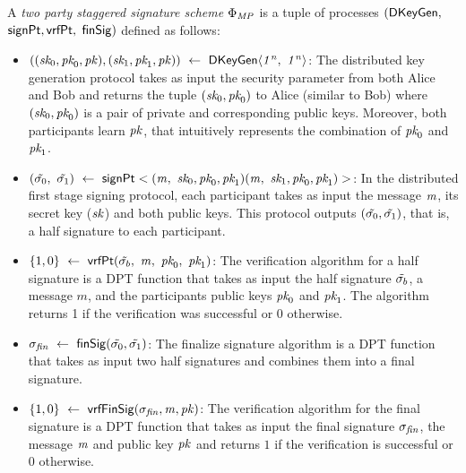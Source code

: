 \begin{definition}
\label{def:two-party-scheme}	
A \emph{two party staggered signature scheme $\Phi_{\mathit{MP}}$} is a tuple of processes $(\mathsf{DKeyGen},$  $\mathsf{signPt}, \mathsf{vrfPt},$ $\mathsf{finSig})$ defined as follows: 
    
    \begin{itemize}
    	\item $((\textit{sk}_0, \textit{pk}_0, \mathit{pk}), (\textit{sk}_1, \textit{pk}_1, \mathit{pk} )) ~\leftarrow~ \mathsf{DKeyGen}\langle \mathit{1^n} ,~ \mathit{1^n} \rangle$: The distributed key generation protocol takes as input the security parameter from both Alice and Bob and returns the tuple $(\textit{sk}_0, \textit{pk}_0)$ to Alice (similar to Bob) where $(\textit{sk}_0, \textit{pk}_0)$ is a pair of private and corresponding public keys. Moreover, both participants learn $\mathit{pk}$, that intuitively represents the combination of $\textit{pk}_0$ and $\textit{pk}_1$. 
    	
    	\item $(\tilde{\sigma_0} ,~ \tilde{\sigma_1}) ~\leftarrow~ \mathsf{signPt}<(\mathit{m} ,~ \textit{sk}_0, \textit{pk}_0, \textit{pk}_1)(\mathit{m} ,~ \textit{sk}_1, \textit{pk}_0, \textit{pk}_1)>$: In the distributed first stage signing protocol, each participant takes as input the message $\mathit{m}$, its secret key ($\mathit{sk}$) and both public keys. This protocol outputs $(\tilde{\sigma_0}, \tilde{\sigma_1})$, that is, a half signature to each participant.  
    	
    	\item $\{1,0\} ~\leftarrow~ \mathsf{vrfPt}(\tilde{\sigma_b} ,~ \mathit{m} ,~ \textit{pk}_0 ,~ \textit{pk}_1)$:  The verification algorithm for a half signature is a DPT function that takes as input the half signature $\tilde{\sigma_b}$, a message $m$, and the participants public keys $\textit{pk}_0$ and $\textit{pk}_1$. The algorithm returns 1 if the verification was successful or 0 otherwise.
        \item $\sigma_{\mathit{fin}} ~\leftarrow~ \mathsf{finSig}(\tilde{\sigma_0},\tilde{\sigma_1})$: The finalize signature algorithm is a DPT function that takes as input two half  signatures and combines them into a final signature.
        
        \item $\{1,0\} ~\leftarrow~ \mathsf{vrfFinSig}(\sigma_{\mathit{fin}}, \mathit{m}, \mathit{pk}) $: The verification algorithm for the final signature is a DPT function that takes as input the final signature $\sigma_{\mathit{fin}}$, the message $\mathit{m}$ and public key $\mathit{pk}$ and returns $1$ if the verification is successful or $0$ otherwise.  
    \end{itemize}
\end{definition}


